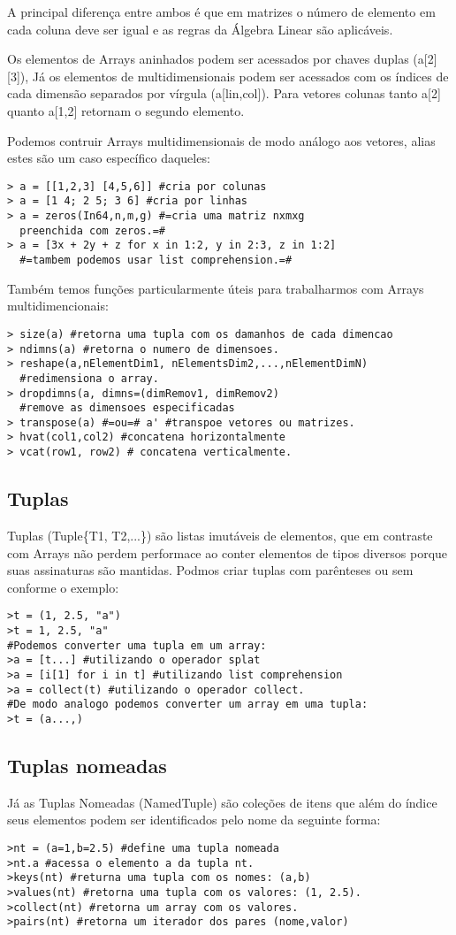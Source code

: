 A principal diferença entre ambos é que em matrizes o número de elemento em cada coluna deve ser igual e as regras da Álgebra Linear são aplicáveis. 


Os elementos de Arrays aninhados podem ser acessados por chaves duplas (a[2][3]), Já os elementos de multidimensionais podem ser acessados com os índices de cada dimensão separados por vírgula (a[lin,col]). Para vetores colunas tanto a[2] quanto a[1,2] retornam o segundo elemento. 

Podemos contruir Arrays multidimensionais de modo análogo aos vetores, alias estes são um caso específico daqueles:
\begin{lstlisting}
> a = [[1,2,3] [4,5,6]] #cria por colunas
> a = [1 4; 2 5; 3 6] #cria por linhas
> a = zeros(In64,n,m,g) #=cria uma matriz nxmxg 
  preenchida com zeros.=#
> a = [3x + 2y + z for x in 1:2, y in 2:3, z in 1:2] 
  #=tambem podemos usar list comprehension.=#
\end{lstlisting}

Também temos funções particularmente úteis para trabalharmos com Arrays multidimencionais:
\begin{lstlisting}
> size(a) #retorna uma tupla com os damanhos de cada dimencao
> ndimns(a) #retorna o numero de dimensoes.
> reshape(a,nElementDim1, nElementsDim2,...,nElementDimN) 
  #redimensiona o array.
> dropdimns(a, dimns=(dimRemov1, dimRemov2) 
  #remove as dimensoes especificadas
> transpose(a) #=ou=# a' #transpoe vetores ou matrizes.
> hvat(col1,col2) #concatena horizontalmente
> vcat(row1, row2) # concatena verticalmente. 
\end{lstlisting}

\subsection{Tuplas}
Tuplas (Tuple\{T1, T2,...\}) são listas imutáveis de elementos, que em contraste com Arrays não perdem performace ao conter elementos de tipos diversos porque suas assinaturas são mantidas. Podmos criar tuplas com parênteses ou sem conforme o exemplo:
\begin{lstlisting}
>t = (1, 2.5, "a")
>t = 1, 2.5, "a"
#Podemos converter uma tupla em um array:
>a = [t...] #utilizando o operador splat
>a = [i[1] for i in t] #utilizando list comprehension
>a = collect(t) #utilizando o operador collect. 
#De modo analogo podemos converter um array em uma tupla:
>t = (a...,)
\end{lstlisting}  

\subsection{Tuplas nomeadas}
Já as Tuplas Nomeadas (NamedTuple) são coleções de itens que além do índice seus elementos podem ser identificados pelo nome da seguinte forma: 
\begin{lstlisting}
>nt = (a=1,b=2.5) #define uma tupla nomeada
>nt.a #acessa o elemento a da tupla nt.
>keys(nt) #returna uma tupla com os nomes: (a,b)
>values(nt) #retorna uma tupla com os valores: (1, 2.5).
>collect(nt) #retorna um array com os valores.
>pairs(nt) #retorna um iterador dos pares (nome,valor) 
\end{lstlisting}

